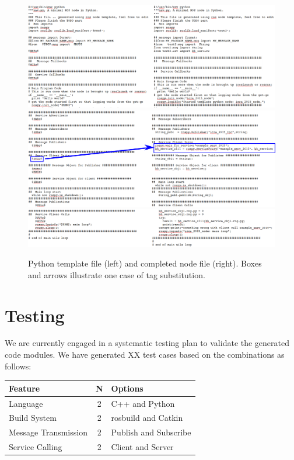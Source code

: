 \documentclass[letterpaper, 10 pt, conference]{ieeeconf}  %
\begin{document}
\begin{figure}
\includegraphics[width=6.25in]{sideBySide1.png}
\includegraphics[width=6.25in]{sideBySide2a.png}
\includegraphics[width=6.25in]{sideBySide3.png}
\caption{Python template file (left) and completed node file (right). Boxes and arrows illustrate one case of tag substitution.}
\label{sidebysidecode}
\end{figure}


\section{Testing}
We are currently engaged in a systematic testing plan to validate the generated code modules.  We have generated XX test cases based on the combinations as follows:

\begin{tabular}{lcl}
Feature & N & Options \\ \hline
Language & 2 & C++ and Python \\
Build System & 2 &  rosbuild and Catkin \\
Message Transmission & 2 & Publish and Subscribe \\
Service Calling & 2 & Client and Server\\
\end{tabular}
\end{document}
